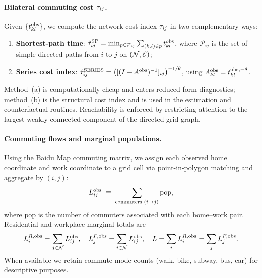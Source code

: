 \paragraph{Bilateral commuting cost $\tau_{ij}$.}
Given $\{t_{kl}^{\mathrm{obs}}\}$, we compute the network cost index $\tau_{ij}$ in
two complementary ways:
\begin{enumerate}[label=(\alph*),leftmargin=2em,itemsep=0.2em]
  \item \textbf{Shortest-path time}: $\hat\tau_{ij}^{\mathrm{SP}}
        =\min_{p\in\mathcal P_{ij}}\sum_{(k,l)\in p}t_{kl}^{\mathrm{obs}}$,
        where $\mathcal P_{ij}$ is the set of simple directed paths
        from $i$ to $j$ on $(\mathcal N,\mathcal E)$;
  \item \textbf{Series cost index}: $\hat\tau_{ij}^{\mathrm{SERIES}}
        =\bigl([(I-A^{\mathrm{obs}})^{-1}]_{ij}\bigr)^{-1/\theta}$, using
        $A^{\mathrm{obs}}_{kl}=t_{kl}^{\mathrm{obs},-\theta}$.
\end{enumerate}
Method~(a) is computationally cheap and enters reduced-form
diagnostics; method~(b) is the structural cost index and is used in
the estimation and counterfactual routines.  Reachability is enforced
by restricting attention to the largest weakly connected component
of the directed grid graph.

\paragraph{Commuting flows and marginal populations.}
Using the Baidu Map commuting matrix, we assign each observed
home coordinate and work coordinate to a grid cell via
point-in-polygon matching and aggregate by $(i,j)$:
\begin{equation}\label{eq:data_Lij}
  L_{ij}^{\mathrm{obs}}
  \;\equiv\;\sum_{\text{commuters }(i\to j)}\mathrm{pop},
\end{equation}
where $\mathrm{pop}$ is the number of commuters associated with each
home--work pair.  Residential and workplace marginal totals are
\begin{equation}\label{eq:data_margins}
  L_i^{R,\mathrm{obs}}=\sum_{j\in\mathcal N}L_{ij}^{\mathrm{obs}},\quad
  L_j^{F,\mathrm{obs}}=\sum_{i\in\mathcal N}L_{ij}^{\mathrm{obs}},\quad
  \bar L=\sum_i L_i^{R,\mathrm{obs}}=\sum_j L_j^{F,\mathrm{obs}}.
\end{equation}
When available we retain commute-mode counts (walk, bike, subway,
bus, car) for descriptive purposes.

